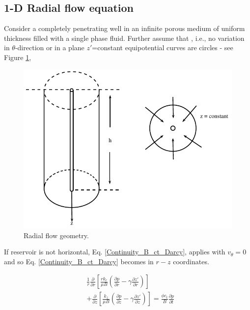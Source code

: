 \documentclass{llncs}
\numberwithin{equation}{section}
\numberwithin{figure}{section}
\numberwithin{table}{section}
\begin{document}
    \subsection{1-D Radial flow equation}
    Consider a completely penetrating well in an infinite porous medium of uniform thickness filled with a single phase fluid. Further assume that , i.e., no variation in $\theta$-direction or in a plane $z'$=constant equipotential curves are circles - see Figure \ref{Radial_Flow_Fig},
    \begin{figure}
        \begin{center}
        \includegraphics[scale=0.8]{Radial_Flow_Fig.pdf}
        \end{center}
        \caption{Radial flow geometry.}
        \label{Radial_Flow_Fig}
    \end{figure}

    If reservoir is not horizontal,  Eq. \ref{Continuity_B_ct_Darcy}, applies with $v_{\theta}=0$ and so Eq. \ref{Continuity_B_ct_Darcy} becomes in $r-z$ coordinates.

    \begin{equation}
        \begin{split}
    & \frac{1}{r}\frac{\partial }{\partial r}\left[ \frac{r{{k}_{r}}}{\mu B}\left( \frac{\partial p}{\partial r}-\gamma \frac{\partial z'}{\partial r} \right) \right] \\
    & +\frac{\partial }{\partial z}\left[ \frac{{{k}_{z}}}{\mu B}\left( \frac{\partial p}{\partial z}-\gamma \frac{\partial z'}{\partial z} \right) \right]=\frac{\phi {{c}_{t}}}{B}\frac{\partial p}{\partial t} \\
    \end{split}
        \label{Radial_Flow}
    \end{equation}
\end{document}

